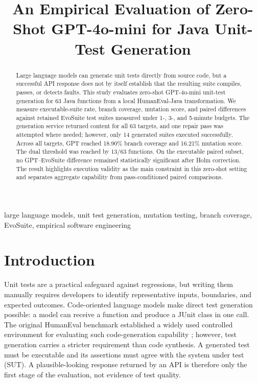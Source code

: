 ﻿\documentclass[conference]{IEEEtran}
\begin{document}
\title{An Empirical Evaluation of Zero-Shot GPT-4o-mini for Java Unit-Test Generation}

\author{
}

\maketitle

\begin{abstract}
Large language models can generate unit tests directly from source code, but a successful API response does not by itself establish that the resulting suite compiles, passes, or detects faults. This study evaluates zero-shot GPT-4o-mini unit-test generation for 63 Java functions from a local HumanEval-Java transformation. We measure executable-suite rate, branch coverage, mutation score, and paired differences against retained EvoSuite test suites measured under 1-, 3-, and 5-minute budgets. The generation service returned content for all 63 targets, and one repair pass was attempted where needed; however, only 14 generated suites executed successfully. Across all targets, GPT reached 18.90\% branch coverage and 16.21\% mutation score. The dual threshold was reached by 13/63 functions. On the executable paired subset, no GPT--EvoSuite difference remained statistically significant after Holm correction. The result highlights execution validity as the main constraint in this zero-shot setting and separates aggregate capability from pass-conditioned paired comparisons.
\end{abstract}

\begin{IEEEkeywords}
large language models, unit test generation, mutation testing, branch coverage, EvoSuite, empirical software engineering
\end{IEEEkeywords}

\section{Introduction}
\label{sec:intro}

Unit tests are a practical safeguard against regressions, but writing them manually requires developers to identify representative inputs, boundaries, and expected outcomes. Code-oriented language models make direct test generation possible: a model can receive a function and produce a JUnit class in one call. The original HumanEval benchmark established a widely used controlled environment for evaluating such code-generation capability \cite{chen2021codex}; however, test generation carries a stricter requirement than code synthesis. A generated test must be executable and its assertions must agree with the system under test (SUT). A plausible-looking response returned by an API is therefore only the first stage of the evaluation, not evidence of test quality.
\end{document}
